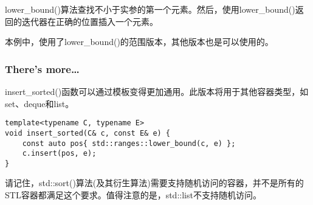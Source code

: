 lower\_bound()算法查找不小于实参的第一个元素。然后，使用lower\_bound()返回的迭代器在正确的位置插入一个元素。

本例中，使用了lower\_bound()的范围版本，其他版本也是可以使用的。

\subsubsection{There's more…}

insert\_sorted()函数可以通过模板变得更加通用。此版本将用于其他容器类型，如set、deque和list。

\begin{lstlisting}[style=styleCXX]
template<typename C, typename E>
void insert_sorted(C& c, const E& e) {
	const auto pos{ std::ranges::lower_bound(c, e) };
	c.insert(pos, e);
}
\end{lstlisting}

请记住，std::sort()算法(及其衍生算法)需要支持随机访问的容器，并不是所有的STL容器都满足这个要求。值得注意的是，std::list不支持随机访问。



















